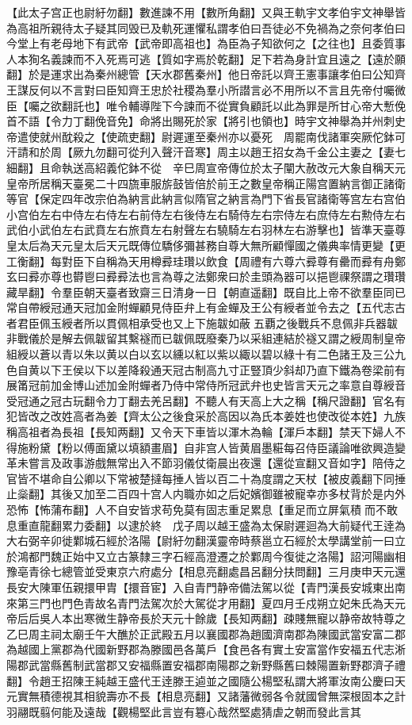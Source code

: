 【此太子宫正也尉紆勿翻】數進諫不用【數所角翻】又與王軌宇文孝伯宇文神舉皆為高祖所親待太子疑其同毁已及軌死運懼私謂孝伯曰吾徒必不免禍為之奈何孝伯曰今堂上有老母地下有武帝【武帝即高祖也】為臣為子知欲何之【之往也】且委質事人本狥名義諫而不入死焉可逃【質如字焉於乾翻】足下若為身計宜且遠之【遠於願翻】於是運求出為秦州總管【天水郡舊秦州】他日帝託以齊王憲事讓孝伯曰公知齊王謀反何以不言對曰臣知齊王忠於社稷為羣小所譛言必不用所以不言且先帝付囑微臣【囑之欲翻託也】唯令輔導陛下今諫而不從實負顧託以此為罪是所甘心帝大慙俛首不語【令力丁翻俛音免】命將出賜死於家【將引也領也】時宇文神舉為并州刺史帝遣使就州酖殺之【使疏吏翻】尉遲運至秦州亦以憂死　周罷南伐諸軍突厥佗鉢可汗請和於周【厥九勿翻可從刋入聲汗音寒】周主以趙王招女為千金公主妻之【妻七細翻】且命執送高紹義佗鉢不從　辛巳周宣帝傳位於太子闡大赦改元大象自稱天元皇帝所居稱天臺冕二十四旒車服旂鼓皆倍於前王之數皇帝稱正陽宫置納言御正諸衛等官【保定四年改宗伯為納言此納言似隋官之納言為門下省長官諸衛等宫左右宫伯小宫伯左右中侍左右侍左右前侍左右後侍左右騎侍左右宗侍左右庶侍左右勲侍左右武伯小武伯左右武賁左右旅賁左右射聲左右驍騎左右羽林左右游擊也】皆準天臺尊皇太后為天元皇太后天元既傳位驕侈彌甚務自尊大無所顧憚國之儀典率情更變【更工衡翻】每對臣下自稱為天用樽彛珪瓚以飲食【周禮有六尊六彛尊有罍而彛有舟鄭玄曰彛亦尊也欎鬯曰彛彛法也言為尊之法鄭衆曰於圭頭為器可以挹鬯祼祭謂之瓚瓚藏旱翻】令羣臣朝天臺者致齋三日清身一日【朝直遥翻】既自比上帝不欲羣臣同已常自帶綬冠通天冠加金附蟬顧見侍臣弁上有金蟬及王公有綬者並令去之【五代志古者君臣佩玉綬者所以貫佩相承受也又上下施韍如蔽五覇之後戰兵不息佩非兵器韍非戰儀於是解去佩韍留其繫襚而已韍佩既廢秦乃以采組連結於襚又謂之綬周制皇帝組綬以蒼以青以朱以黄以白以玄以纁以紅以紫以緅以碧以綠十有二色諸王及三公九色自黄以下王侯以下以差降殺通天冠古制高九寸正豎頂少斜却乃直下鐵為卷梁前有展筩冠前加金博山述加金附蟬者乃侍中常侍所冠武弁也史皆言天元之率意自尊綬音受冠通之冠古玩翻令力丁翻去羌呂翻】不聽人有天高上大之稱【稱尺證翻】官名有犯皆改之改姓高者為姜【齊太公之後食采於高因以為氏本姜姓也使改從本姓】九族稱高祖者為長祖【長知两翻】又令天下車皆以渾木為輪【渾戶本翻】禁天下婦人不得施粉黛【粉以傅面黛以填額畫眉】自非宫人皆黄眉墨糚每召侍臣議論唯欲興造變革未嘗言及政事游戲無常出入不節羽儀仗衛晨出夜還【還從宣翻又音如字】陪侍之官皆不堪命自公卿以下常被楚撻每捶人皆以百二十為度謂之天杖【被皮義翻下同捶止橤翻】其後又加至二百四十宫人内職亦如之后妃嬪御雖被寵幸亦多杖背於是内外恐怖【怖蒲布翻】人不自安皆求苟免莫有固志重足累息【重足而立屏氣積而不敢息重直龍翻累力委翻】以逮於終　戊子周以越王盛為太保尉遲迴為大前疑代王逹為大右弼辛卯徙鄴城石經於洛陽【尉紆勿翻漢靈帝時蔡邕立石經於太學講堂前一曰立於鴻都門魏正始中又立古篆隸三字石經高澄遷之於鄴周今復徙之洛陽】詔河陽幽相豫亳青徐七總管並受東京六府處分【相息亮翻處昌呂翻分扶問翻】三月庚申天元還長安大陳軍伍親擐甲胄【擐音宦】入自青門静帝備法駕以從【青門漢長安城東出南來第三門也門色青故名青門法駕次於大駕從才用翻】夏四月壬戍朔立妃朱氏為天元帝后后吳人本出寒微生静帝長於天元十餘歲【長知两翻】疎賤無寵以静帝故特尊之乙巳周主祠太廟壬午大醮於正武殿五月以襄國郡為趙國濟南郡為陳國武當安富二郡為越國上黨郡為代國新野郡為滕國邑各萬戶【食邑各有實土安富當作安福五代志淅陽郡武當縣舊制武當郡又安福縣置安福郡南陽郡之新野縣舊曰棘陽置新野郡濟子禮翻】令趙王招陳王純越王盛代王逹滕王逌並之國隨公楊堅私謂大將軍汝南公慶曰天元實無積德視其相貌壽亦不長【相息亮翻】又諸藩微弱各令就國曾無深根固本之計羽翮既翦何能及遠哉【觀楊堅此言豈有簒心哉然堅處猜虐之朝而發此言其